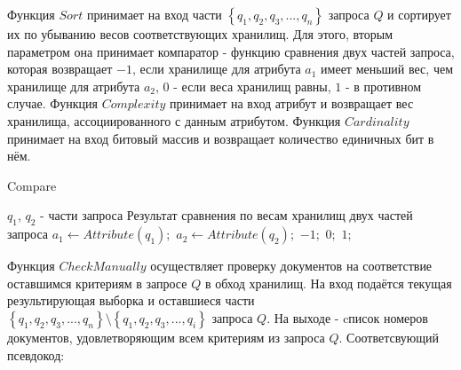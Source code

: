 \documentclass{matmex-diploma}
\begin{document}
        Функция $Sort$ принимает на вход части $\left\{ q_1, q_2, q_3, ... , q_n \right\}$ запроса $Q$ и сортирует их по убыванию весов соответствующих хранилищ. Для этого, вторым параметром она принимает компаратор - функцию сравнения двух частей запроса, которая возвращает $-1$, если хранилище для атрибута $a_1$ имеет меньший вес, чем хранилище для атрибута $a_2$, $0$ - если веса хранилищ равны, $1$ - в противном случае. Функция $Complexity$ принимает на вход атрибут и возвращает вес хранилища, ассоциированного с данным атрибутом. Функция $Cardinality$ принимает на вход битовый массив и возвращает количество единичных бит в нём. 
        \begin{algorithm}[H]                   
        \caption{Compare}              
        \label{cmp}                        
            \begin{algorithmic}        
                \REQUIRE $q_1$, $q_2$ - части запроса
                \ENSURE Результат сравнения по весам хранилищ двух частей запроса
                \STATE $a_1 \leftarrow Attribute(q_1);$
                \STATE $a_2 \leftarrow Attribute(q_2);$
                    \RETURN $-1;$
                \ELSE 
                        \RETURN $0;$
                    \ELSE
                        \RETURN $1;$
                    \ENDIF
                \ENDIF
            \end{algorithmic}
        \end{algorithm}
        
        Функция $CheckManually$ осуществляет проверку документов на соответствие оставшимся критериям в запросе $Q$ в обход хранилищ. На вход подаётся текущая результирующая выборка и оставшиеся части $\left\{ q_1, q_2, q_3, ... , q_n \right\} \setminus \left\{ q_1, q_2, q_3, ... , q_i \right\}$ запроса $Q$. На выходе - cписок номеров документов, удовлетворяющим всем критериям из запроса $Q$. Соответсвующий псевдокод:
        
\end{document}
